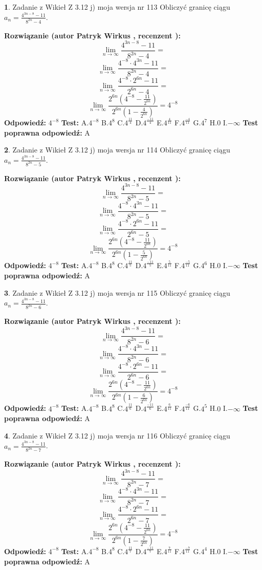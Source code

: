 \documentclass[12pt, a4paper]{article}
\theoremstyle{definition} %
\newtheorem{zad}{}
\newcommand{\zadStart}[1]{\begin{zad}#1\newline}
\newcommand{\zadStop}{\end{zad}}
\newcommand{\rozwStart}[2]{\noindent \textbf{Rozwiązanie (autor #1 , recenzent #2): }\newline}
\newcommand{\rozwStop}{\newline}
\newcommand{\odpStart}{\noindent \textbf{Odpowiedź:}\newline}
\newcommand{\odpStop}{\newline}
\newcommand{\testStart}{\noindent \textbf{Test:}\newline}
\newcommand{\testStop}{\newline}
\newcommand{\kluczStart}{\noindent \textbf{Test poprawna odpowiedź:}\newline}
\newcommand{\kluczStop}{\newline}
\begin{document}
\zadStart{Zadanie z Wikieł Z 3.12 j) moja wersja nr 113}
Obliczyć granicę ciągu $a_{n}=\frac{4^{3n-8}-11}{8^{2n}-4}$.
\zadStop
\rozwStart{Patryk Wirkus}{}
$$\lim\limits_{n\to\infty}\frac{4^{3n-8}-11}{8^{2n}-4}=$$
$$\lim\limits_{n\to\infty}\frac{4^{-8} \cdot 4^{3n}-11}{8^{2n}-4}=$$
$$\lim\limits_{n\to\infty}\frac{4^{-8} \cdot 2^{6n}-11}{2^{6n}-4}=$$
$$\lim\limits_{n\to\infty}\frac{2^{6n}(4^{-8} - \frac{11}{2^{6n}})}{2^{6n}(1-\frac{4}{2^{6n}})}= 4^{-8}$$
\rozwStop
\odpStart
$4^{-8}$
\odpStop
\testStart
A.$4^{-8}$
B.$4^{8}$
C.$4^{\frac{11}{4}}$
D.$4^{\frac{-11}{4}}$
E.$4^{\frac{4}{11}}$
F.$4^{\frac{-4}{11}}$
G.$4^{7}$
H.$0$
I.$-\infty$
\testStop
\kluczStart
A
\kluczStop



\zadStart{Zadanie z Wikieł Z 3.12 j) moja wersja nr 114}
Obliczyć granicę ciągu $a_{n}=\frac{4^{3n-8}-11}{8^{2n}-5}$.
\zadStop
\rozwStart{Patryk Wirkus}{}
$$\lim\limits_{n\to\infty}\frac{4^{3n-8}-11}{8^{2n}-5}=$$
$$\lim\limits_{n\to\infty}\frac{4^{-8} \cdot 4^{3n}-11}{8^{2n}-5}=$$
$$\lim\limits_{n\to\infty}\frac{4^{-8} \cdot 2^{6n}-11}{2^{6n}-5}=$$
$$\lim\limits_{n\to\infty}\frac{2^{6n}(4^{-8} - \frac{11}{2^{6n}})}{2^{6n}(1-\frac{5}{2^{6n}})}= 4^{-8}$$
\rozwStop
\odpStart
$4^{-8}$
\odpStop
\testStart
A.$4^{-8}$
B.$4^{8}$
C.$4^{\frac{11}{5}}$
D.$4^{\frac{-11}{5}}$
E.$4^{\frac{5}{11}}$
F.$4^{\frac{-5}{11}}$
G.$4^{6}$
H.$0$
I.$-\infty$
\testStop
\kluczStart
A
\kluczStop



\zadStart{Zadanie z Wikieł Z 3.12 j) moja wersja nr 115}
Obliczyć granicę ciągu $a_{n}=\frac{4^{3n-8}-11}{8^{2n}-6}$.
\zadStop
\rozwStart{Patryk Wirkus}{}
$$\lim\limits_{n\to\infty}\frac{4^{3n-8}-11}{8^{2n}-6}=$$
$$\lim\limits_{n\to\infty}\frac{4^{-8} \cdot 4^{3n}-11}{8^{2n}-6}=$$
$$\lim\limits_{n\to\infty}\frac{4^{-8} \cdot 2^{6n}-11}{2^{6n}-6}=$$
$$\lim\limits_{n\to\infty}\frac{2^{6n}(4^{-8} - \frac{11}{2^{6n}})}{2^{6n}(1-\frac{6}{2^{6n}})}= 4^{-8}$$
\rozwStop
\odpStart
$4^{-8}$
\odpStop
\testStart
A.$4^{-8}$
B.$4^{8}$
C.$4^{\frac{11}{6}}$
D.$4^{\frac{-11}{6}}$
E.$4^{\frac{6}{11}}$
F.$4^{\frac{-6}{11}}$
G.$4^{5}$
H.$0$
I.$-\infty$
\testStop
\kluczStart
A
\kluczStop



\zadStart{Zadanie z Wikieł Z 3.12 j) moja wersja nr 116}
Obliczyć granicę ciągu $a_{n}=\frac{4^{3n-8}-11}{8^{2n}-7}$.
\zadStop
\rozwStart{Patryk Wirkus}{}
$$\lim\limits_{n\to\infty}\frac{4^{3n-8}-11}{8^{2n}-7}=$$
$$\lim\limits_{n\to\infty}\frac{4^{-8} \cdot 4^{3n}-11}{8^{2n}-7}=$$
$$\lim\limits_{n\to\infty}\frac{4^{-8} \cdot 2^{6n}-11}{2^{6n}-7}=$$
$$\lim\limits_{n\to\infty}\frac{2^{6n}(4^{-8} - \frac{11}{2^{6n}})}{2^{6n}(1-\frac{7}{2^{6n}})}= 4^{-8}$$
\rozwStop
\odpStart
$4^{-8}$
\odpStop
\testStart
A.$4^{-8}$
B.$4^{8}$
C.$4^{\frac{11}{7}}$
D.$4^{\frac{-11}{7}}$
E.$4^{\frac{7}{11}}$
F.$4^{\frac{-7}{11}}$
G.$4^{4}$
H.$0$
I.$-\infty$
\testStop
\kluczStart
A
\kluczStop
\end{document}
